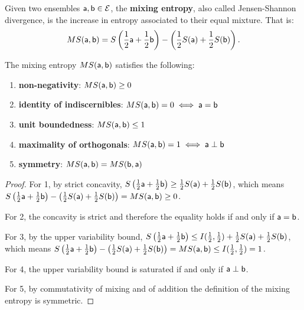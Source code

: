 \begin{mathSection}
\begin{defn}
	Given two ensembles $\ens[a], \ens[b] \in \Ens$, the \textbf{mixing entropy}, also called Jensen-Shannon divergence, is the increase in entropy associated to their equal mixture. That is:
	$$MS(\ens[a], \ens[b]) = S\left(\frac{1}{2}\ens[a] + \frac{1}{2} \ens[b]\right) - \left(\frac{1}{2} S(\ens[a]) + \frac{1}{2} S(\ens[b])\right).$$
\end{defn}

\begin{prop}
	The mixing entropy $MS(\ens[a], \ens[b])$ satisfies the following:
	\begin{enumerate}
		\item \textbf{non-negativity}: $MS(\ens[a], \ens[b]) \geq 0$
		\item \textbf{identity of indiscernibles}: $MS(\ens[a], \ens[b]) = 0 \iff \ens[a]=\ens[b]$
		\item \textbf{unit boundedness}: $MS(\ens[a], \ens[b]) \leq 1$
		\item \textbf{maximality of orthogonals}: $MS(\ens[a], \ens[b]) = 1 \iff \ens[a] \ortho \ens[b]$
		\item \textbf{symmetry}: $MS(\ens[a], \ens[b]) = MS(\ens[b], \ens[a])$
	\end{enumerate}
\end{prop}

\begin{proof}
	For 1, by strict concavity, $S\left(\frac{1}{2} \ens[a] + \frac{1}{2} \ens[b]\right) \geq \frac{1}{2} S(\ens[a]) + \frac{1}{2} S(\ens[b])$, which means $S\left(\frac{1}{2} \ens[a] + \frac{1}{2} \ens[b]\right) - \left(\frac{1}{2} S(\ens[a]) + \frac{1}{2} S(\ens[b])\right) = MS(\ens[a], \ens[b]) \geq 0$.
	
	For 2, the concavity is strict and therefore the equality holds if and only if $\ens[a] = \ens[b]$.
	
	For 3, by the upper variability bound, $S\left(\frac{1}{2} \ens[a] + \frac{1}{2} \ens[b]\right) \leq I(\frac{1}{2}, \frac{1}{2}) + \frac{1}{2} S(\ens[a]) + \frac{1}{2} S(\ens[b])$, which means $S\left(\frac{1}{2} \ens[a] + \frac{1}{2} \ens[b]\right) - \left(\frac{1}{2} S(\ens[a]) + \frac{1}{2} S(\ens[b])\right) = MS(\ens[a], \ens[b]) \leq I(\frac{1}{2}, \frac{1}{2}) = 1$.
	
	For 4, the upper variability bound is saturated if and only if $\ens[a] \ortho \ens[b]$.
	
	For 5, by commutativity of mixing and of addition the definition of the mixing entropy is symmetric.
\end{proof}


\end{mathSection}
